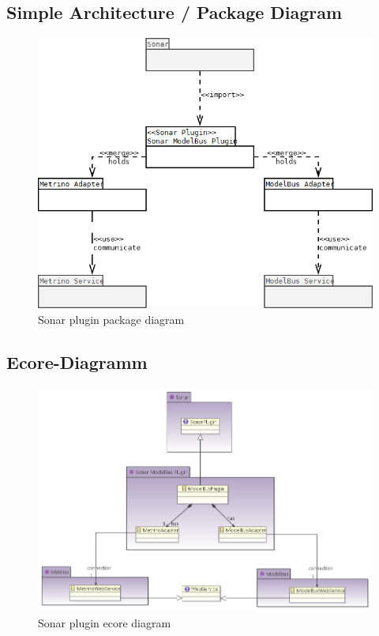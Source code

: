 \subsection{Simple Architecture / Package Diagram}
\begin{figure}
	\centering
		\includegraphics[width=\textwidth]{plugin_package_dia}
	\caption{Sonar plugin package diagram}
	\label{fig:sonarrunning}
\end{figure}

\subsection{Ecore-Diagramm}
\begin{figure}
	\centering
		\includegraphics[width=\textwidth]{plugin_ecore_dia}
	\caption{Sonar plugin ecore diagram}
	\label{fig:sonarrunning}
\end{figure}


